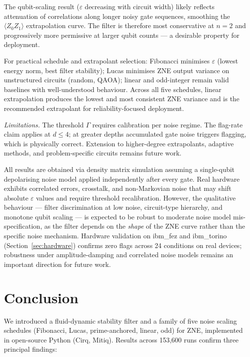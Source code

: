 \documentclass[10pt,letterpaper]{article}
\begin{document}
The qubit-scaling result ($\varepsilon$ decreasing with circuit width)
likely reflects attenuation of correlations along longer noisy gate
sequences, smoothing the $\langle Z_0 Z_1\rangle$ extrapolation curve.
The filter is therefore most conservative at $n=2$ and progressively
more permissive at larger qubit counts --- a desirable property for
deployment.

For practical schedule and extrapolant selection: Fibonacci minimises
$\varepsilon$ (lowest energy norm, best filter stability); Lucas
minimises ZNE output variance on unstructured circuits (random, QAOA);
linear and odd-integer remain valid baselines with well-understood
behaviour. Across all five schedules, linear extrapolation produces
the lowest and most consistent ZNE variance and is the recommended
extrapolant for reliability-focused deployment.

\textit{Limitations.} The threshold $\Gamma$ requires calibration per
noise regime. The flag-rate claim applies at $d\leq 4$; at greater
depths accumulated gate noise triggers flagging, which is physically
correct. Extension to higher-degree extrapolants, adaptive methods,
and problem-specific circuits remains future work.

All results are obtained via density matrix simulation assuming a
single-qubit depolarising noise model applied independently after
every gate. Real hardware exhibits correlated errors, crosstalk, and
non-Markovian noise that may shift absolute $\varepsilon$ values and
require threshold recalibration. However, the qualitative behaviour
--- filter discrimination at low noise, circuit-type hierarchy, and
monotone qubit scaling --- is expected to be robust to moderate noise
model mis-specification, as the filter depends on the \textit{shape}
of the ZNE curve rather than the specific noise mechanism.
Hardware validation on ibm\_fez and ibm\_torino
(Section~\ref{sec:hardware}) confirms zero flags across 24 conditions
on real devices; robustness under amplitude-damping and correlated
noise models remains an important direction for future work.

\section{Conclusion}

We introduced a fluid-dynamic stability filter and a family of five
noise scaling schedules (Fibonacci, Lucas, prime-anchored, linear, odd)
for ZNE, implemented in open-source Python (Cirq, Mitiq).
Results across 153,600 runs confirm three principal findings:
\end{document}
